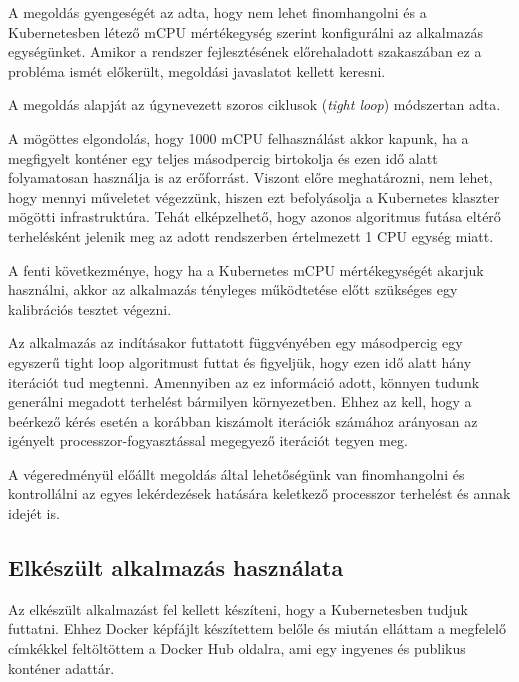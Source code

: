 A megoldás gyengeségét az adta, hogy nem lehet finomhangolni és a Kubernetesben létező mCPU mértékegység szerint konfigurálni az alkalmazás egységünket.
Amikor a rendszer fejlesztésének előrehaladott szakaszában ez a probléma ismét előkerült, megoldási javaslatot kellett keresni.

A megoldás alapját az úgynevezett szoros ciklusok (\textit{tight loop}\citep{tightLoop}) módszertan adta.

A mögöttes elgondolás, hogy 1000 mCPU felhasználást akkor kapunk, ha a megfigyelt konténer egy teljes másodpercig birtokolja és ezen idő alatt folyamatosan használja is az erőforrást.
Viszont előre meghatározni, nem lehet, hogy mennyi műveletet végezzünk, hiszen ezt befolyásolja a Kubernetes klaszter mögötti infrastruktúra.
Tehát elképzelhető, hogy azonos algoritmus futása eltérő terhelésként jelenik meg az adott rendszerben értelmezett 1 CPU egység miatt.

A fenti következménye, hogy ha a Kubernetes mCPU mértékegységét akarjuk használni, akkor az alkalmazás tényleges működtetése előtt szükséges egy kalibrációs tesztet végezni.

Az alkalmazás az indításakor futtatott függvényében egy másodpercig egy egyszerű tight loop algoritmust futtat és figyeljük, hogy ezen idő alatt hány iterációt tud megtenni.
Amennyiben az ez információ adott, könnyen tudunk generálni megadott terhelést bármilyen környezetben.
Ehhez az kell, hogy a beérkező kérés esetén a korábban kiszámolt iterációk számához arányosan az igényelt processzor-fogyasztással megegyező iterációt tegyen meg. 

A végeredményül előállt megoldás által lehetőségünk van finomhangolni és kontrollálni az egyes lekérdezések hatására keletkező processzor terhelést és annak idejét is. 

\subsection{Elkészült alkalmazás használata}
Az elkészült alkalmazást fel kellett készíteni, hogy a Kubernetesben tudjuk futtatni. Ehhez Docker képfájlt készítettem belőle és miután elláttam a megfelelő címkékkel feltöltöttem\citep{dockerContainer} a Docker Hub oldalra, ami egy ingyenes és publikus konténer adattár. \\

\lstset{caption=Konténer futtatása és válasza, label=describe_pod}


